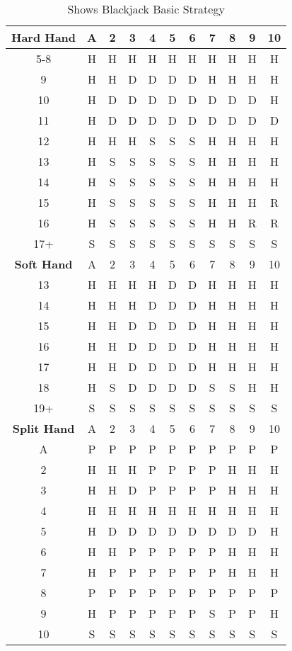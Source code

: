 \documentclass{article}
\begin{document}
\begin{table}[htb]
\begin{tabular}{|c|c|c|c|c|c|c|c|c|c|c|}
\hline
\textbf{Hard Hand} & A & 2 & 3 & 4 & 5 & 6 & 7 & 8 & 9 & 10 \\
\hline
5-8 & H & H & H & H & H & H & H & H & H & H\\
9  & H & H & D & D & D & D & H & H & H & H\\
10 & H & D & D & D & D & D & D & D & D & H\\
11 & H & D & D & D & D & D & D & D & D & D\\
12 & H & H & H & S & S & S & H & H & H & H\\
13 & H & S & S & S & S & S & H & H & H & H\\
14 & H & S & S & S & S & S & H & H & H & H\\
15 & H & S & S & S & S & S & H & H & H & R\\
16 & H & S & S & S & S & S & H & H & R & R\\
17+& S & S & S & S & S & S & S & S & S & S\\
\hline
\textbf{Soft Hand} & A & 2 & 3 & 4 & 5 & 6 & 7 & 8 & 9 & 10 \\
\hline
13 & H & H & H & H & D & D & H & H & H & H\\
14 & H & H & H & D & D & D & H & H & H & H\\
15 & H & H & D & D & D & D & H & H & H & H\\
16 & H & H & D & D & D & D & H & H & H & H\\
17 & H & H & D & D & D & D & H & H & H & H\\
18 & H & S & D & D & D & D & S & S & H & H\\
19+& S & S & S & S & S & S & S & S & S & S\\
\hline
\textbf{Split Hand} & A & 2 & 3 & 4 & 5 & 6 & 7 & 8 & 9 & 10 \\
\hline
A & P & P & P & P & P & P & P & P & P & P\\
2 & H & H & H & P & P & P & P & H & H & H\\
3 & H & H & D & P & P & P & P & H & H & H\\
4 & H & H & H & H & H & H & H & H & H & H\\
5 & H & D & D & D & D & D & D & D & D & H\\
6 & H & H & P & P & P & P & P & H & H & H\\
7 & H & P & P & P & P & P & P & H & H & H\\
8 & P & P & P & P & P & P & P & P & P & P\\
9 & H & P & P & P & P & P & S & P & P & H\\
10& S & S & S & S & S & S & S & S & S & S\\
\hline

\end{tabular}
\caption{Shows Blackjack Basic Strategy}
\end{table}
\end{document}
